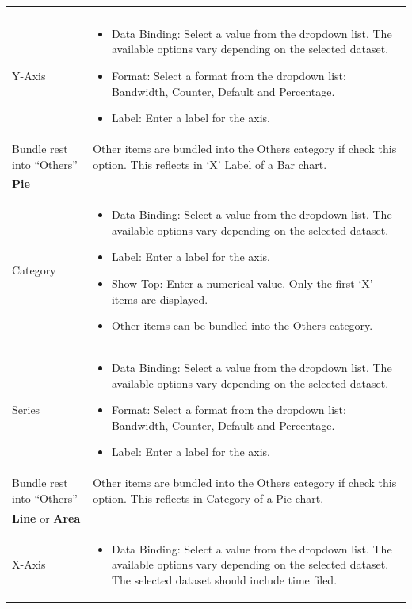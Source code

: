 \begin{description}
\begin{longtable}{p{}|p{}}
\begin{itemize}
                 \end{itemize} \\\hline 
        Y-Axis & \begin{itemize}
                    \item Data Binding: Select a value from the dropdown list. The available options vary depending on the selected dataset.
                    \item Format: Select a format from the dropdown list: Bandwidth, Counter, Default and Percentage.
                    \item Label: Enter a label for the axis.            
                 \end{itemize} \\\hline 
        Bundle rest into “Others” & Other items are bundled into the Others category if check this option. This reflects in ‘X’ Label of a Bar chart. \\\hline 
        \multicolumn{2}{l}{\textbf{Pie}}\\\hline
        Category & \begin{itemize}
                        \item Data Binding: Select a value from the dropdown list. The available options vary depending on the selected dataset.
                        \item Label: Enter a label for the axis.
                        \item Show Top: Enter a numerical value. Only the first ‘X’ items are displayed.
                        \item Other items can be bundled into the Others category.
                   \end{itemize} \\\hline 
        Series & \begin{itemize}
                    \item Data Binding: Select a value from the dropdown list. The available options vary depending on the selected dataset.
                    \item Format: Select a format from the dropdown list: Bandwidth, Counter, Default and Percentage.
                    \item Label: Enter a label for the axis.
                 \end{itemize} \\\hline
        Bundle rest into “Others” & Other items are bundled into the Others category if check this option. This reflects in Category of a Pie chart.\\\hline
        \multicolumn{2}{l}{\textbf{Line} or \textbf{Area}}\\\hline
        X-Axis & \begin{itemize}
                    \item Data Binding: Select a value from the dropdown list. The available options vary depending on the selected dataset. The selected dataset should include time filed.
                    


\end{itemize}
\end{longtable}
\end{description}
